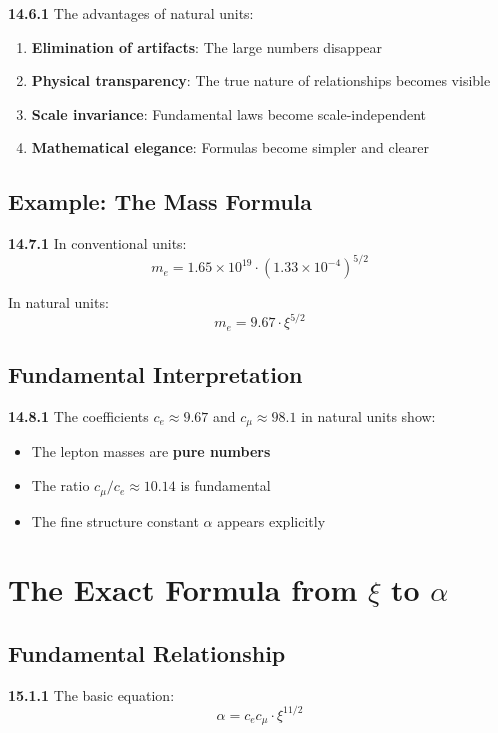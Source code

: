 \noindent \textbf{14.6.1} The advantages of natural units:
\begin{enumerate}
	\item \textbf{Elimination of artifacts}: The large numbers disappear
	\item \textbf{Physical transparency}: The true nature of relationships becomes visible
	\item \textbf{Scale invariance}: Fundamental laws become scale-independent
	\item \textbf{Mathematical elegance}: Formulas become simpler and clearer
\end{enumerate}

\subsection{Example: The Mass Formula}

\noindent \textbf{14.7.1} In conventional units:
\[
m_e = 1.65 \times 10^{19} \cdot (1.33 \times 10^{-4})^{5/2}
\]

In natural units:
\[
m_e = 9.67 \cdot \xi^{5/2}
\]

\subsection{Fundamental Interpretation}

\noindent \textbf{14.8.1} The coefficients $c_e \approx 9.67$ and $c_\mu \approx 98.1$ in natural units show:

\begin{itemize}
	\item The lepton masses are \textbf{pure numbers}
	\item The ratio $c_\mu/c_e \approx 10.14$ is fundamental
	\item The fine structure constant $\alpha$ appears explicitly
\end{itemize}

\section{The Exact Formula from $\xi$ to $\alpha$}

\subsection{Fundamental Relationship}

\noindent \textbf{15.1.1} The basic equation:
\[
\boxed{\alpha = c_e c_\mu \cdot \xi^{11/2}}
\]

